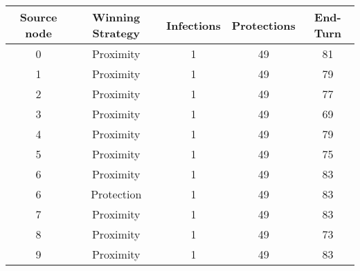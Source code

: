 \documentclass[results.tex]{subfiles}
\begin{document}
    \begin{center}
        \begin{tabular}{| c || c | c | c | c |}
            \hline
            {\bfseries Source node} & {\bfseries Winning Strategy} & {\bfseries Infections} & {\bfseries Protections}
            & {\bfseries End-Turn}
            \\  %
            \hline\hline
            0                       & Proximity                    & 1                      & 49                      & 81                   \\
            \hline
            1                       & Proximity                    & 1                      & 49                      & 79                   \\
            \hline
            2                       & Proximity                    & 1                      & 49                      & 77                   \\
            \hline
            3                       & Proximity                    & 1                      & 49                      & 69                   \\
            \hline
            4                       & Proximity                    & 1                      & 49                      & 79                   \\
            \hline
            5                       & Proximity                    & 1                      & 49                      & 75                   \\
            \hline
            6                       & Proximity                    & 1                      & 49                      & 83                   \\
            \hline
            6                       & Protection                   & 1                      & 49                      & 83                   \\
            \hline
            7                       & Proximity                    & 1                      & 49                      & 83                   \\
            \hline
            8                       & Proximity                    & 1                      & 49                      & 73                   \\
            \hline
            9                       & Proximity                    & 1                      & 49                      & 83                   \\

\end{tabular}
\end{center}
\end{document}
